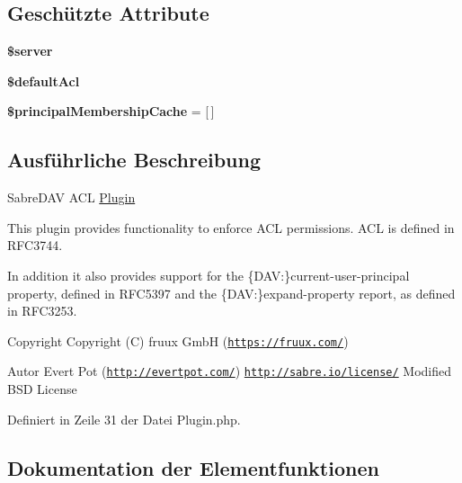 \subsection*{Geschützte Attribute}
\begin{DoxyCompactItemize}
\item 
\mbox{\label{class_sabre_1_1_d_a_v_a_c_l_1_1_plugin_a1a6d2708aaa07ea0f2b2e2aec8eca8bf}} 
{\bfseries \$server}
\item 
{\bfseries \$default\+Acl}
\item 
\mbox{\label{class_sabre_1_1_d_a_v_a_c_l_1_1_plugin_a53397a84cfa955bb0d21c8d3a8368ccb}} 
{\bfseries \$principal\+Membership\+Cache} = \mbox{[}$\,$\mbox{]}
\end{DoxyCompactItemize}


\subsection{Ausführliche Beschreibung}
Sabre\+D\+AV A\+CL \mbox{\hyperlink{class_sabre_1_1_d_a_v_a_c_l_1_1_plugin}{Plugin}}

This plugin provides functionality to enforce A\+CL permissions. A\+CL is defined in R\+F\+C3744.

In addition it also provides support for the \{D\+AV\+:\}current-\/user-\/principal property, defined in R\+F\+C5397 and the \{D\+AV\+:\}expand-\/property report, as defined in R\+F\+C3253.

\begin{DoxyCopyright}{Copyright}
Copyright (C) fruux GmbH (\href{https://fruux.com/}{\tt https\+://fruux.\+com/}) 
\end{DoxyCopyright}
\begin{DoxyAuthor}{Autor}
Evert Pot (\href{http://evertpot.com/}{\tt http\+://evertpot.\+com/})  \href{http://sabre.io/license/}{\tt http\+://sabre.\+io/license/} Modified B\+SD License 
\end{DoxyAuthor}


Definiert in Zeile 31 der Datei Plugin.\+php.



\subsection{Dokumentation der Elementfunktionen}
\mbox{\label{class_sabre_1_1_d_a_v_a_c_l_1_1_plugin_af53450a7c5fa4efcaa40c22d1f8988e7}} 
